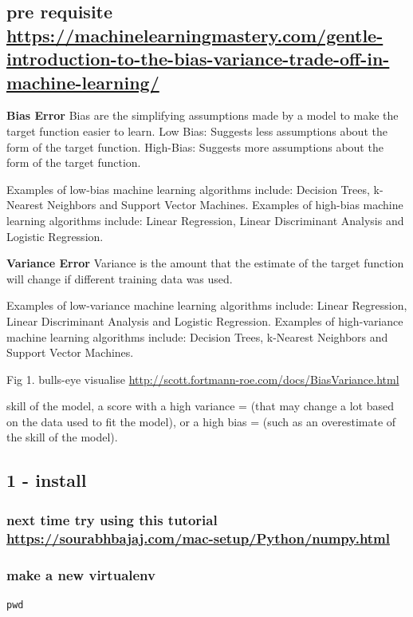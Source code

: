 \documentclass[11pt]{article}
\begin{document}
\subsection{pre requisite \url{https://machinelearningmastery.com/gentle-introduction-to-the-bias-variance-trade-off-in-machine-learning/}}
\label{sec:org492cc74}
\textbf{Bias Error}
Bias are the simplifying assumptions made by a model to make the target function easier to learn.
Low Bias: Suggests less assumptions about the form of the target function.
High-Bias: Suggests more assumptions about the form of the target function.

Examples of low-bias machine learning algorithms include: Decision Trees, k-Nearest Neighbors and Support Vector Machines.
Examples of high-bias machine learning algorithms include: Linear Regression, Linear Discriminant Analysis and Logistic Regression.

\textbf{Variance Error}
Variance is the amount that the estimate of the target function will change if different training data was used.

Examples of low-variance machine learning algorithms include: Linear Regression, Linear Discriminant Analysis and Logistic Regression.
Examples of high-variance machine learning algorithms include: Decision Trees, k-Nearest Neighbors and Support Vector Machines.

Fig 1. bulls-eye visualise \url{http://scott.fortmann-roe.com/docs/BiasVariance.html}

skill of the model, a score with 
a high variance = (that may change a lot based on the data used to fit the model), or 
a high bias = (such as an overestimate of the skill of the model).

\subsection{1 - install}
\label{sec:orgaecae8c}
\subsubsection{next time try using this tutorial \url{https://sourabhbajaj.com/mac-setup/Python/numpy.html}}
\label{sec:orgb199b74}
\subsubsection{make a new virtualenv}
\label{sec:orgfb5f7f6}
\begin{verbatim}
pwd
\end{verbatim}
\end{document}
